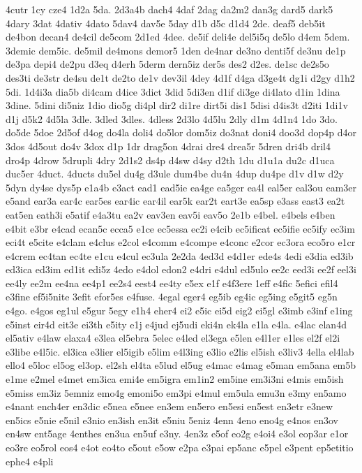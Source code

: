 {4cutr
1cy
cze4
1d2a
5da.
2d3a4b
dach4
4daf
2dag
da2m2
dan3g
dard5
dark5
4dary
3dat
4dativ
4dato
5dav4
dav5e
5day
d1b
d5c
d1d4
2de.
deaf5
deb5it
de4bon
decan4
de4cil
de5com
2d1ed
4dee.
de5if
deli4e
del5i5q
de5lo
d4em
5dem.
3demic
dem5ic.
de5mil
de4mons
demor5
1den
de4nar
de3no
denti5f
de3nu
de1p
de3pa
depi4
de2pu
d3eq
d4erh
5derm
dern5iz
der5s
des2
d2es.
de1sc
de2s5o
des3ti
de3str
de4su
de1t
de2to
de1v
dev3il
4dey
4d1f
d4ga
d3ge4t
dg1i
d2gy
d1h2
5di.
1d4i3a
dia5b
di4cam
d4ice
3dict
3did
5di3en
d1if
di3ge
di4lato
d1in
1dina
3dine.
5dini
di5niz
1dio
dio5g
di4pl
dir2
di1re
dirt5i
dis1
5disi
d4is3t
d2iti
1di1v
d1j
d5k2
4d5la
3dle.
3dled
3dles.
4dless
2d3lo
4d5lu
2dly
d1m
4d1n4
1do
3do.
do5de
5doe
2d5of
d4og
do4la
doli4
do5lor
dom5iz
do3nat
doni4
doo3d
dop4p
d4or
3dos
4d5out
do4v
3dox
d1p
1dr
drag5on
4drai
dre4
drea5r
5dren
dri4b
dril4
dro4p
4drow
5drupli
4dry
2d1s2
ds4p
d4sw
d4sy
d2th
1du
d1u1a
du2c
d1uca
duc5er
4duct.
4ducts
du5el
du4g
d3ule
dum4be
du4n
4dup
du4pe
d1v
d1w
d2y
5dyn
dy4se
dys5p
e1a4b
e3act
ead1
ead5ie
ea4ge
ea5ger
ea4l
eal5er
eal3ou
eam3er
e5and
ear3a
ear4c
ear5es
ear4ic
ear4il
ear5k
ear2t
eart3e
ea5sp
e3ass
east3
ea2t
eat5en
eath3i
e5atif
e4a3tu
ea2v
eav3en
eav5i
eav5o
2e1b
e4bel.
e4bels
e4ben
e4bit
e3br
e4cad
ecan5c
ecca5
e1ce
ec5essa
ec2i
e4cib
ec5ificat
ec5ifie
ec5ify
ec3im
eci4t
e5cite
e4clam
e4clus
e2col
e4comm
e4compe
e4conc
e2cor
ec3ora
eco5ro
e1cr
e4crem
ec4tan
ec4te
e1cu
e4cul
ec3ula
2e2da
4ed3d
e4d1er
ede4s
4edi
e3dia
ed3ib
ed3ica
ed3im
ed1it
edi5z
4edo
e4dol
edon2
e4dri
e4dul
ed5ulo
ee2c
eed3i
ee2f
eel3i
ee4ly
ee2m
ee4na
ee4p1
ee2s4
eest4
ee4ty
e5ex
e1f
e4f3ere
1eff
e4fic
5efici
efil4
e3fine
ef5i5nite
3efit
efor5es
e4fuse.
4egal
eger4
eg5ib
eg4ic
eg5ing
e5git5
eg5n
e4go.
e4gos
eg1ul
e5gur
5egy
e1h4
eher4
ei2
e5ic
ei5d
eig2
ei5gl
e3imb
e3inf
e1ing
e5inst
eir4d
eit3e
ei3th
e5ity
e1j
e4jud
ej5udi
eki4n
ek4la
e1la
e4la.
e4lac
elan4d
el5ativ
e4law
elaxa4
e3lea
el5ebra
5elec
e4led
el3ega
e5len
e4l1er
e1les
el2f
el2i
e3libe
e4l5ic.
el3ica
e3lier
el5igib
e5lim
e4l3ing
e3lio
e2lis
el5ish
e3liv3
4ella
el4lab
ello4
e5loc
el5og
el3op.
el2sh
el4ta
e5lud
el5ug
e4mac
e4mag
e5man
em5ana
em5b
e1me
e2mel
e4met
em3ica
emi4e
em5igra
em1in2
em5ine
em3i3ni
e4mis
em5ish
e5miss
em3iz
5emniz
emo4g
emoni5o
em3pi
e4mul
em5ula
emu3n
e3my
en5amo
e4nant
ench4er
en3dic
e5nea
e5nee
en3em
en5ero
en5esi
en5est
en3etr
e3new
en5ics
e5nie
e5nil
e3nio
en3ish
en3it
e5niu
5eniz
4enn
4eno
eno4g
e4nos
en3ov
en4sw
ent5age
4enthes
en3ua
en5uf
e3ny.
4en3z
e5of
eo2g
e4oi4
e3ol
eop3ar
e1or
eo3re
eo5rol
eos4
e4ot
eo4to
e5out
e5ow
e2pa
e3pai
ep5anc
e5pel
e3pent
ep5etitio
ephe4
e4pli
}

